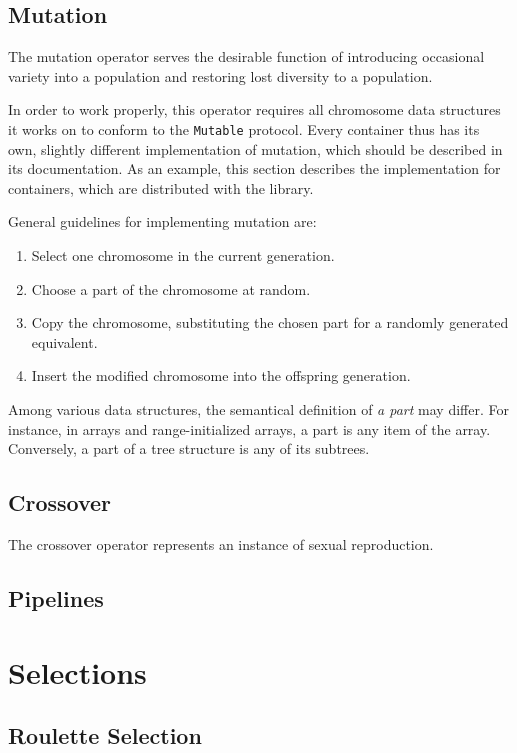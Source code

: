 \subsection{Mutation}\label{section:mutation}
The mutation operator serves the desirable function of introducing occasional variety into a population and restoring lost diversity to a population. \cite{Koza1992}

In order to work properly, this operator requires all chromosome data structures it works on to conform to the \texttt{Mutable} protocol. Every container thus has its own, slightly different implementation of mutation, which should be described in its documentation. As an example, this section describes the implementation for containers, which are distributed with the library.

General guidelines for implementing mutation are:
~
\begin{enumerate}
	\item Select one chromosome in the current generation.
	\item Choose a part of the chromosome at random.
	\item Copy the chromosome, substituting the chosen part for a randomly generated equivalent.
	\item Insert the modified chromosome into the offspring generation.
\end{enumerate}

Among various data structures, the semantical definition of \textit{a part} may differ. For instance, in arrays and range-initialized arrays, a part is any item of the array. Conversely, a part of a tree structure is any of its subtrees.

\subsection{Crossover}\label{section:crossover}
The crossover operator represents an instance of sexual reproduction. 
\todo

\subsection{Pipelines}\label{section:pipelines}
\todo

\section{Selections}\label{section:selection}
\todo

\subsection{Roulette Selection}
\todo

